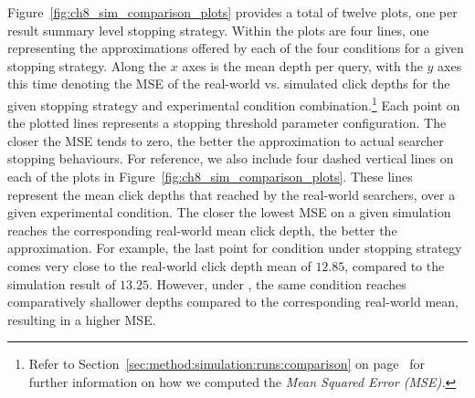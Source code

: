 Figure~\ref{fig:ch8_sim_comparison_plots} provides a total of twelve plots, one per result summary level stopping strategy. Within the plots are four lines, one representing the approximations offered by each of the four conditions for a given stopping strategy. Along the $x$ axes is the mean depth per query, with the $y$ axes this time denoting the MSE of the real-world vs. simulated click depths for the given stopping strategy and experimental condition combination.\footnote{Refer to Section~\ref{sec:method:simulation:runs:comparison} on page~\pageref{sec:method:simulation:runs:comparison} for further information on how we computed the \emph{Mean Squared Error (MSE).}} Each point on the plotted lines represents a stopping threshold parameter configuration. The closer the MSE tends to zero, the better the approximation to actual searcher stopping behaviours. For reference, we also include four dashed vertical lines on each of the plots in Figure~\ref{fig:ch8_sim_comparison_plots}. These lines represent the mean click depths that reached by the real-world searchers, over a given experimental condition. The closer the lowest MSE on a given simulation reaches the corresponding real-world mean click depth, the better the approximation. For example, the last point for condition  under stopping strategy  comes very close to the real-world click depth mean of $12.85$, compared to the simulation result of $13.25$. However, under , the same condition reaches comparatively shallower depths compared to the corresponding real-world mean, resulting in a higher MSE.

